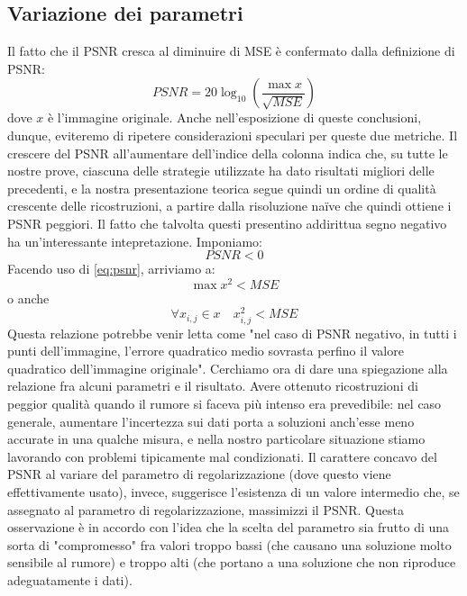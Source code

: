 \documentclass[a4paper]{article}
\begin{document}
\subsection{Variazione dei parametri}
Il fatto che il PSNR cresca al diminuire di MSE è confermato dalla definizione
di PSNR:
\begin{equation}\label{eq:psnr}
  PSNR = 20 \log_{10}(\frac{\max{x}}{\sqrt{MSE}})
\end{equation}
dove $x$ è l'immagine originale. Anche nell'esposizione di queste conclusioni,
dunque, eviteremo di ripetere considerazioni speculari per queste due metriche.
Il crescere del PSNR all'aumentare dell'indice della colonna indica che, su
tutte le nostre prove, ciascuna delle strategie utilizzate ha dato risultati
migliori delle precedenti, e la nostra presentazione teorica segue quindi un
ordine di qualità crescente delle ricostruzioni, a partire dalla risoluzione
naïve che quindi ottiene i PSNR peggiori. Il fatto che talvolta questi
presentino addirittua segno negativo ha un'interessante intepretazione.
Imponiamo:
\begin{equation}
  PSNR < 0
\end{equation}
Facendo uso di \ref{eq:psnr}, arriviamo a:
\begin{equation}
  \max{x^2} < MSE
\end{equation}
o anche
\begin{equation}
  \forall x_{i,j} \in x \quad x_{i,j}^2 < MSE
\end{equation}
Questa relazione potrebbe venir letta come "nel caso di PSNR negativo, in tutti
i punti dell'immagine, l'errore quadratico medio sovrasta perfino il valore
quadratico dell'immagine originale". Cerchiamo ora di dare una spiegazione alla
relazione fra alcuni parametri e il risultato. Avere ottenuto ricostruzioni di
peggior qualità quando il rumore si faceva più intenso era prevedibile: nel caso
generale, aumentare l'incertezza sui dati porta a soluzioni anch'esse meno
accurate in una qualche misura, e nella nostro particolare situazione stiamo
lavorando con problemi tipicamente mal condizionati. Il carattere concavo del
PSNR al variare del parametro di regolarizzazione (dove questo viene
effettivamente usato), invece, suggerisce l'esistenza di un valore intermedio
che, se assegnato al parametro di regolarizzazione, massimizzi il PSNR. Questa
osservazione è in accordo con l'idea che la scelta del parametro sia frutto di
una sorta di "compromesso" fra valori troppo bassi (che causano una soluzione
molto sensibile al rumore) e troppo alti (che portano a una soluzione che non
riproduce adeguatamente i dati).
\end{document}
